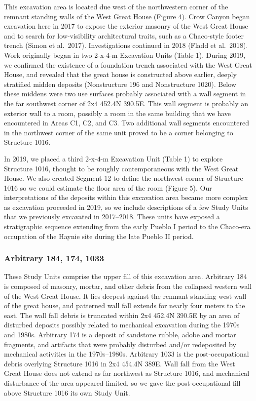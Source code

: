 \documentclass[
  12pt,
]{krantz}
\begin{document}
This excavation area is located due west of the northwestern corner of
the remnant standing walls of the West Great House (Figure 4). Crow
Canyon began excavation here in 2017 to expose the exterior masonry of
the West Great House and to search for low-visibility architectural
traits, such as a Chaco-style footer trench (Simon et al.~2017).
Investigations continued in 2018 (Fladd et al.~2018). Work originally
began in two 2-x-4-m Excavation Units (Table 1). During 2019, we
confirmed the existence of a foundation trench associated with the West
Great House, and revealed that the great house is constructed above
earlier, deeply stratified midden deposits (Nonstructure 196 and
Nonstructure 1020). Below these middens were two use surfaces probably
associated with a wall segment in the far southwest corner of 2x4 452.4N
390.5E. This wall segment is probably an exterior wall to a room,
possibly a room in the same building that we have encountered in Areas
C1, C2, and C3. Two additional wall segments encountered in the
northwest corner of the same unit proved to be a corner belonging to
Structure 1016.

In 2019, we placed a third 2-x-4-m Excavation Unit (Table 1) to explore
Structure 1016, thought to be roughly contemporaneous with the West
Great House. We also created Segment 12 to define the northwest corner
of Structure 1016 so we could estimate the floor area of the room
(Figure 5). Our interpretations of the deposits within this excavation
area became more complex as excavation proceeded in 2019, so we include
descriptions of a few Study Units that we previously excavated in
2017--2018. These units have exposed a stratigraphic sequence extending
from the early Pueblo I period to the Chaco-era occupation of the Haynie
site during the late Pueblo II period.

\hypertarget{arbitrary-184-174-1033}{%
\subsubsection{Arbitrary 184, 174, 1033}\label{arbitrary-184-174-1033}}

These Study Units comprise the upper fill of this excavation area.
Arbitrary 184 is composed of masonry, mortar, and other debris from the
collapsed western wall of the West Great House. It lies deepest against
the remnant standing west wall of the great house, and patterned wall
fall extends for nearly four meters to the east. The wall fall debris is
truncated within 2x4 452.4N 390.5E by an area of disturbed deposits
possibly related to mechanical excavation during the 1970s and 1980s.
Arbitrary 174 is a deposit of sandstone rubble, adobe and mortar
fragments, and artifacts that were probably disturbed and/or redeposited
by mechanical activities in the 1970s--1980s. Arbitrary 1033 is the
post-occupational debris overlying Structure 1016 in 2x4 454.4N 389E.
Wall fall from the West Great House does not extend as far northwest as
Structure 1016, and mechanical disturbance of the area appeared limited,
so we gave the post-occupational fill above Structure 1016 its own Study
Unit.
\end{document}
